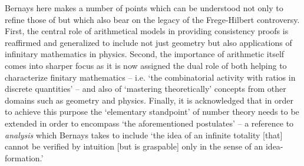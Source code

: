 \documentclass[11pt,fleqn,leqno]{article}
\begin{document}
Bernays here makes a number of points which can be understood not only to refine those of \citet{Hilbert1900} but which also bear on the legacy of the Frege-Hilbert controversy.  First, the central role of arithmetical models in providing consistency proofs is reaffirmed and generalized to include not just geometry but also applications of infinitary mathematics in physics.   Second, the importance of arithmetic itself comes into sharper focus as it is now assigned the dual role of both helping to characterize finitary mathematics -- i.e. `the combinatorial activity with ratios in discrete quantities' -- and also of `mastering theoretically' concepts from other domains such as geometry and physics.    Finally, it is acknowledged that in order to achieve this purpose  the `elementary standpoint' of number theory needs to be extended in order to encompass `the aforementioned postulates' -- a reference to \textsl{analysis} which Bernays takes to include  `the idea of an infinite totality [that] cannot be verified by intuition [but is graspable] only in the sense of an idea-formation.' \citeyearpar[p. 252]{Bernays1930}
\end{document}
